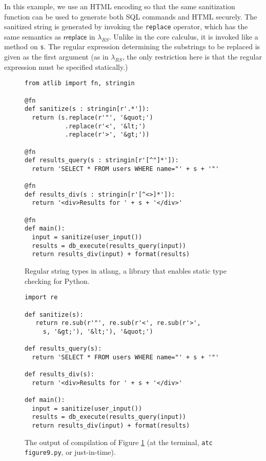 \documentclass[9pt]{sig-alternate}
\theoremstyle{definition}
\begin{document}
In this example, we use an HTML encoding so that the same sanitization function can be used to generate both SQL commands and HTML securely. The sanitized string is generated by invoking the \verb|replace| operator, which has the same semantics as $\textsf{rreplace}$ in $\lambda_{RS}$. Unlike in the core calculus, it is invoked like a method on \verb|s|. The regular expression determining the substrings to be replaced is given as the first argument (as in $\lambda_{RS}$, the only restriction here is that the regular expression must be specified statically.)

\begin{figure}[ht]\small\begin{lstlisting}
from atlib import fn, stringin

@fn
def sanitize(s : stringin[r'.*']):
  return (s.replace(r'"', '&quot;') 
           .replace(r'<', '&lt;')
           .replace(r'>', '&gt;'))

@fn
def results_query(s : stringin[r'[^"]*']):
  return 'SELECT * FROM users WHERE name="' + s + '"'

@fn
def results_div(s : stringin[r'[^<>]*']):
  return '<div>Results for ' + s + '</div>'

@fn
def main():
  input = sanitize(user_input())
  results = db_execute(results_query(input))
  return results_div(input) + format(results)
\end{lstlisting}
\vspace{-10px}
\caption{Regular string types in atlang, a library that enables static type checking for Python. }\label{fig:atexample}
\end{figure}

\begin{figure}
\begin{lstlisting}
import re

def sanitize(s):
   return re.sub(r'"', re.sub(r'<', re.sub(r'>', 
     s, '&gt;'), '&lt;'), '&quot;')

def results_query(s): 
  return 'SELECT * FROM users WHERE name="' + s + '"'

def results_div(s):
  return '<div>Results for ' + s + '</div>'

def main():
  input = sanitize(user_input())
  results = db_execute(results_query(input))
  return results_div(input) + format(results)
\end{lstlisting}
\vspace{-10px}
\caption{The output of compilation of Figure \ref{fig:atexample} (at the terminal, \texttt{atc figure9.py}, or just-in-time).}
\label{fig:atexample-out}
\end{figure} 
\end{document}
